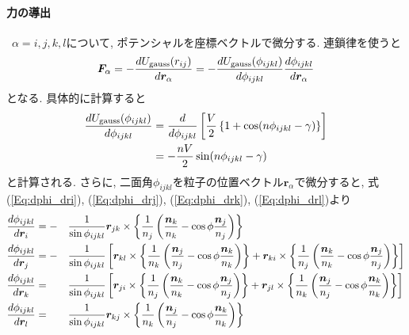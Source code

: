 \paragraph{力の導出} \
$\alpha = i, j, k, l$について, ポテンシャルを座標ベクトルで微分する. 連鎖律を使うと
\begin{equation}
   \bm{F}_{\alpha}
   =
   -
   \frac{d U_{\mathrm{gauss}}(r_{ij})}{d \bm{r}_{\alpha}}
   =
   -
   \frac{d U_{\mathrm{gauss}}(\phi_{ijkl})}{d \phi_{ijkl}}
   \frac{d \phi_{ijkl}}{d \bm{r}_{\alpha}}
   \notag
\end{equation}
となる. 具体的に計算すると
\begin{align}
   \frac{d U_{\mathrm{gauss}}(\phi_{ijkl})}{d \phi_{ijkl}}
   &=
   \frac{d}{d \phi_{ijkl}}
   \left[
          \frac{V}{2}
          \left\{ 1 + \cos(n\phi_{ijkl} - \gamma) \right\}
   \right]
   \notag \\
   &=
   -
   \frac{nV}{2} \sin(n\phi_{ijkl} - \gamma)
   \notag
\end{align}
と計算される. さらに, 二面角$\phi_{ijkl}$を粒子の位置ベクトル$\bm{r}_{\alpha}$で微分すると,
式(\ref{Eq:dphi_dri}), (\ref{Eq:dphi_drj}), (\ref{Eq:dphi_drk}), (\ref{Eq:dphi_drl})より
\begin{alignat}{4}
   \frac{d \phi_{ijkl}}{d \bm{r}_{i}}
   &=
   -&&
   \frac{1}{\sin \phi_{ijkl}}
   \bm{r}_{jk} \times
   \left\{
          \frac{1}{n_{j}}
          \left(
                 \frac{\bm{n}_{k}}{n_{k}} - \cos\phi \frac{\bm{n}_{j}}{n_{j}}
          \right)
   \right\}
   \notag
   \\
   \frac{d \phi_{ijkl}}{d \bm{r}_{j}}
   &=
   -&&
   \frac{1}{\sin \phi_{ijkl}}
   \left[
      \bm{r}_{kl} \times
      \left\{
             \frac{1}{n_{k}}
             \left(
                    \frac{\bm{n}_{j}}{n_{j}} - \cos\phi \frac{\bm{n}_{k}}{n_{k}}
             \right)
      \right\}
    +
      \bm{r}_{ki} \times
      \left\{
             \frac{1}{n_{j}}
             \left(
                    \frac{\bm{n}_{k}}{n_{k}} - \cos\phi \frac{\bm{n}_{j}}{n_{j}}
             \right)
      \right\}
   \right]
   \notag
   \\
   \frac{d \phi_{ijkl}}{d \bm{r}_{k}}
   &=&&
   \frac{1}{\sin \phi_{ijkl}}
   \left[
      \bm{r}_{ji} \times
      \left\{
             \frac{1}{n_{j}}
             \left(
                    \frac{\bm{n}_{k}}{n_{k}} - \cos\phi \frac{\bm{n}_{j}}{n_{j}}
             \right)
      \right\}
    +
      \bm{r}_{jl} \times
      \left\{
             \frac{1}{n_{k}}
             \left(
                    \frac{\bm{n}_{j}}{n_{j}} - \cos\phi \frac{\bm{n}_{k}}{n_{k}}
             \right)
      \right\}
   \right]
   \notag
   \\
   \frac{d \phi_{ijkl}}{d \bm{r}_{l}}
   &=&&
   \frac{1}{\sin \phi_{ijkl}}
   \bm{r}_{kj} \times
   \left\{
          \frac{1}{n_{k}}
          \left(
                 \frac{\bm{n}_{j}}{n_{j}} - \cos\phi \frac{\bm{n}_{k}}{n_{k}}
          \right)
   \right\}
   \notag
\end{alignat}
